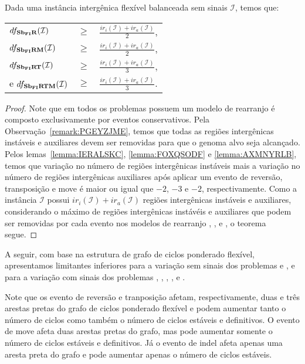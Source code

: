 \begin{theorem}\label{theorem:KKKUCDHN}
Dada uma instância intergênica flexível balanceada sem sinais $\mathcal{I}$, temos que:

\begin{tabular}{lll}
  $df_{\textbf{Sb\textsubscript{FI}R}}(\mathcal{I})$      & $ \ge $ & $\frac{ir_i(\mathcal{I}) + ir_a(\mathcal{I})}{2}$, \\ 
  $df_{\textbf{Sb\textsubscript{FI}RM}}(\mathcal{I})$     & $ \ge $ & $\frac{ir_i(\mathcal{I}) + ir_a(\mathcal{I})}{2}$, \\
  $df_{\textbf{Sb\textsubscript{FI}RT}}(\mathcal{I})$     & $ \ge $ & $\frac{ir_i(\mathcal{I}) + ir_a(\mathcal{I})}{3}$, \\
  e $df_{\textbf{Sb\textsubscript{FI}RTM}}(\mathcal{I})$  & $ \ge $ & $\frac{ir_i(\mathcal{I}) + ir_a(\mathcal{I})}{3}$. \\
\end{tabular}
\end{theorem}
\begin{proof}
Note que em todos os problemas possuem um modelo de rearranjo é composto exclusivamente por eventos conservativos. Pela Observação~\ref{remark:PGEYZJME}, temos que todas as regiões intergênicas instáveis e auxiliares devem ser removidas para que o genoma alvo seja alcançado. Pelos lemas~\ref{lemma:IERALSKC}, \ref{lemma:FOXQSODF} e \ref{lemma:AXMNYRLB}, temos que variação no número de regiões intergênicas instáveis mais a variação no número de regiões intergênicas auxiliares após aplicar um evento de reversão, transposição e move é maior ou igual que $-2$, $-3$ e $-2$, respectivamente. Como a instância $\mathcal{I}$ possui $ir_i(\mathcal{I}) + ir_a(\mathcal{I})$ regiões intergênicas instáveis e auxiliares, considerando o máximo de regiões intergênicas instávéis e auxiliares que podem ser removidas por cada evento nos modelos de rearranjo \SbFIR{}, \SbFIRM{}, \SbFIRT{} e \SbFIRTM{}, o teorema segue.
\end{proof}

A seguir, com base na estrutura de grafo de ciclos ponderado flexível, apresentamos limitantes inferiores para a variação sem sinais dos problemas \SbFIT{} e \SbFITM{}, e para a variação com sinais dos problemas \SbFIR{}, \SbFIRI{}, \SbFIRM{}, \SbFIRMI{}, \SbFIRT{} e \SbFIRTM{}.

Note que os evento de reversão e tranposição afetam, respectivamente, duas e três arestas pretas do grafo de ciclos ponderado flexível e podem aumentar tanto o número de ciclos como também o número de ciclos estáveis e definitivos. O evento de move afeta duas arestas pretas do grafo, mas pode aumentar somente o número de ciclos estáveis e definitivos. Já o evento de indel afeta apenas uma aresta preta do grafo e pode aumentar apenas o número de ciclos estáveis.

